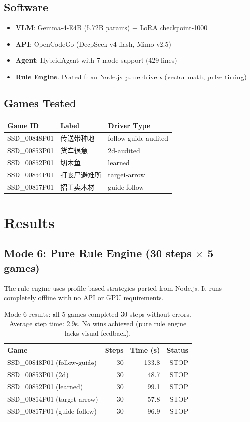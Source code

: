 \documentclass[11pt,a4paper]{article}
\begin{document}
\subsection{Software}
\begin{itemize}
  \item \textbf{VLM}: Gemma-4-E4B (5.72B params) + LoRA checkpoint-1000
  \item \textbf{API}: OpenCodeGo (DeepSeek-v4-flash, Mimo-v2.5)
  \item \textbf{Agent}: HybridAgent with 7-mode support (429 lines)
  \item \textbf{Rule Engine}: Ported from Node.js game drivers (vector math, pulse timing)
\end{itemize}

\subsection{Games Tested}
\begin{table}[H]
\centering
\begin{tabular}{lll}
\toprule
Game ID & Label & Driver Type \\
\midrule
SSD\_00848P01 & 传送带种地 & follow-guide-audited \\
SSD\_00853P01 & 货车很急 & 2d-audited \\
SSD\_00862P01 & 切木鱼 & learned \\
SSD\_00864P01 & 打丧尸避难所 & target-arrow \\
SSD\_00867P01 & 招工卖木材 & guide-follow \\
\bottomrule
\end{tabular}
\end{table}

\section{Results}

\subsection{Mode 6: Pure Rule Engine (30 steps $\times$ 5 games)}
The rule engine uses profile-based strategies ported from Node.js. It runs completely offline 
with no API or GPU requirements.

\begin{table}[H]
\centering
\begin{tabular}{lrrr}
\toprule
Game & Steps & Time (s) & Status \\
\midrule
SSD\_00848P01 (follow-guide) & 30 & 133.8 & STOP \\
SSD\_00853P01 (2d) & 30 & 48.7 & STOP \\
SSD\_00862P01 (learned) & 30 & 99.1 & STOP \\
SSD\_00864P01 (target-arrow) & 30 & 57.8 & STOP \\
SSD\_00867P01 (guide-follow) & 30 & 96.9 & STOP \\
\bottomrule
\end{tabular}
\caption{Mode 6 results: all 5 games completed 30 steps without errors. 
Average step time: 2.9s. No wins achieved (pure rule engine lacks visual feedback).}
\end{table}
\end{document}
